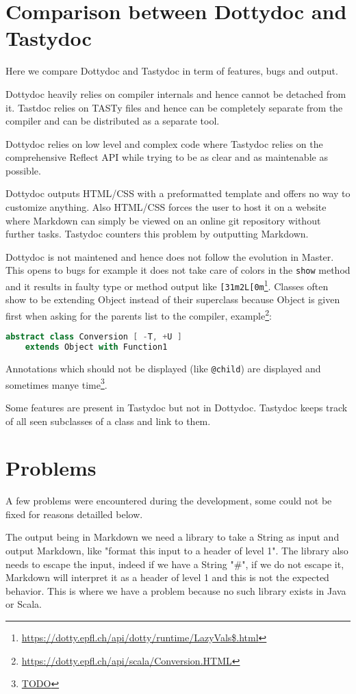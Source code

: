 \documentclass{report}
\begin{document}
\chapter{Comparison between Dottydoc and Tastydoc}
Here we compare Dottydoc and Tastydoc in term of features, bugs and output.

Dottydoc heavily relies on compiler internals and hence cannot be detached from it. Tastdoc relies on TASTy files and hence can be completely separate from the compiler and can be distributed as a separate tool.

Dottydoc relies on low level and complex code where Tastydoc relies on the comprehensive Reflect API while trying to be as clear and as maintenable as possible.

Dottydoc outputs HTML/CSS with a preformatted template and offers no way to customize anything. Also HTML/CSS forces the user to host it on a website where Markdown can simply be viewed on an online git repository without further tasks. Tastydoc counters this problem by outputting Markdown.

Dottydoc is not maintened and hence does not follow the evolution in Master. This opens to bugs for example it does not take care of colors in the \texttt{show} method and it results in faulty type or method output like \texttt{[31m2L[0m}\footnote{\url{https://dotty.epfl.ch/api/dotty/runtime/LazyVals$.html}}. Classes often show to be extending Object instead of their superclass because Object is given first when asking for the parents list to the compiler, example\footnote{\url{https://dotty.epfl.ch/api/scala/Conversion.HTML}}:
\begin{lstlisting}[language=scala]
    abstract class Conversion [ -T, +U ]
    extends Object with Function1
\end{lstlisting}
Annotations which should not be displayed (like \texttt{@child}) are displayed and sometimes manye time\footnote{\url{TODO}}.

Some features are present in Tastydoc but not in Dottydoc. Tastydoc keeps track of all seen subclasses of a class and link to them.

\chapter{Problems}
\label{sec:problems}
A few problems were encountered during the development, some could not be fixed for reasons detailled below.

The output being in Markdown we need a library to take a String as input and output Markdown, like "format this input to a header of level 1". The library also needs to escape the input, indeed if we have a String "\#", if we do not escape it, Markdown will interpret it as a header of level 1 and this is not the expected behavior. This is where we have a problem because no such library exists in Java or Scala.
\end{document}
